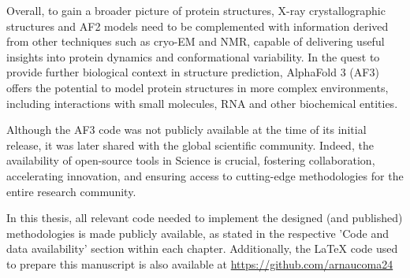 Overall, to gain a broader picture of protein structures, X-ray crystallographic structures and AF2 models need to be complemented with information derived from other techniques such as cryo-EM and NMR, capable of delivering useful insights into protein dynamics and conformational variability. In the quest to provide further biological context in structure prediction, AlphaFold 3 (AF3) offers the potential to model protein structures in more complex environments, including interactions with small molecules, RNA and other biochemical entities\cite{abramson_accurate_2024}.

Although the AF3 code was not publicly available at the time of its initial release\cite{abramson_accurate_2024}, it was later shared with the global scientific community\cite{callaway_ai_2024}. Indeed, the availability of open-source tools in Science is crucial, fostering collaboration, accelerating innovation, and ensuring access to cutting-edge methodologies for the entire research community. 

In this thesis, all relevant code needed to implement the designed (and published) methodologies is made publicly available, as stated in the respective 'Code and data availability' section within each chapter. Additionally, the LaTeX code used to prepare this manuscript is also available at \href{https://github.com/arnaucoma24}{https://github.com/arnaucoma24}




